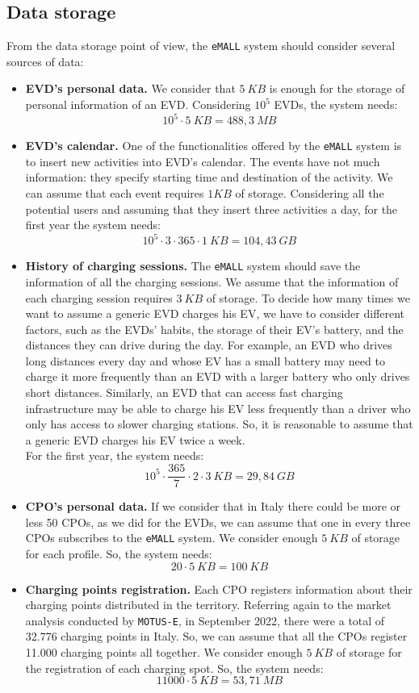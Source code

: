 \subsection*{Data storage}
From the data storage point of view, the \verb|eMALL| system should consider several sources of data:
\begin{itemize}
    \item \textbf{EVD's personal data.} We consider that $5\ KB$ is enough for the storage of personal information of an EVD\@.
    Considering $10^5$ EVDs, the system needs:
    \[
        10^5\cdot5\ KB = 488,3\ MB
    \]
    \item \textbf{EVD's calendar.} One of the functionalities offered by the \verb|eMALL| system is to insert new activities
    into EVD's calendar.
    The events have not much information: they specify starting time and destination of the activity.
    We can assume that each event requires $1 KB$ of storage.
    Considering all the potential users and assuming that they insert three activities a day, for the first year the system needs:
    \[
        10^5\cdot 3\cdot 365\cdot 1\ KB = 104,43\ GB
    \]
    \item \textbf{History of charging sessions.} The \verb|eMALL| system should save the information of all the charging sessions.
    We assume that the information of each charging session requires $3\ KB$ of storage.
    To decide how many times we want to assume a generic EVD charges his EV, we have to consider different factors,
    such as the EVDs' habits, the storage of their EV's battery, and the distances they can drive during the day.
    For example, an EVD who drives long distances every day and whose EV has a small battery may need to charge
    it more frequently than an EVD with a larger battery who only drives short distances.
    Similarly, an EVD that can access fast charging infrastructure may be able to charge his EV less frequently than
    a driver who only has access to slower charging stations.
    So, it is reasonable to assume that a generic EVD charges his EV twice a week. \\
    For the first year, the system needs:
    \[
        10^5\cdot \frac{365}{7} \cdot 2\cdot 3\ KB = 29,84\ GB
    \]
    \item \textbf{CPO's personal data.} If we consider that in Italy there could be more or less 50 CPOs,
    as we did for the EVDs, we can assume that one in every three CPOs subscribes to the \verb|eMALL| system.
    We consider enough $5\ KB$ of storage for each profile.
    So, the system needs:
    \[
        20\cdot 5\ KB = 100\ KB
    \]
    \item \textbf{Charging points registration.} Each CPO registers information about their charging points distributed in the territory.
    Referring again to the market analysis conducted by \verb|MOTUS-E|, in September 2022,
    there were a total of 32.776 charging points in Italy.
    So, we can assume that all the CPOs register 11.000 charging points all together.
    We consider enough $5\ KB$ of storage for the registration of each charging spot.
    So, the system needs:
    \[
        11 000\cdot 5\ KB = 53,71\ MB
    \]
\end{itemize}
